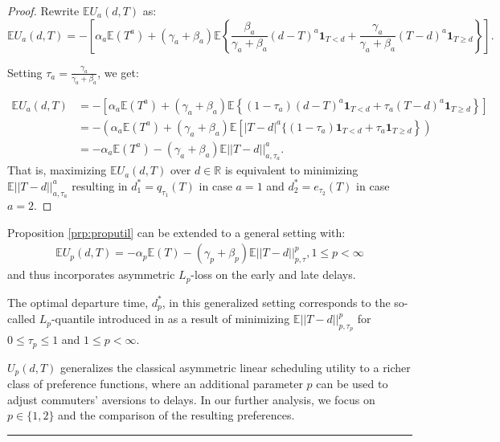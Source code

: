 \documentclass[preprint, 3p, authoryear]{elsarticle} %
\theoremstyle{definition}
\theoremstyle{definition}
\theoremstyle{definition}
\theoremstyle{definition}
\theoremstyle{remark}
\begin{document}
\begin{proof}
Rewrite \(\mathbb EU_a(d,T)\) as:
\[\mathbb EU_a(d,T) = -\left[\alpha_a \mathbb E(T^a) + (\gamma_a+\beta_a)\mathbb E\left\{\frac{\beta_a}{\gamma_a+\beta_a}(d-T)^a\mathbf 1_{T<d}+ \frac{\gamma_a}{\gamma_a+\beta_a}(T-d)^a\mathbf 1_{T\geq d}\right\}\right].\]

Setting \(\tau_a=\frac{\gamma_a}{\gamma_a+\beta_a}\), we get:

\begin{align}
\mathbb EU_a(d,T) &= -\left[\alpha_a \mathbb E(T^a) + (\gamma_a+\beta_a)\mathbb E\left\{(1-\tau_a)(d-T)^a\mathbf 1_{T<d}+ \tau_a(T-d)^a\mathbf 1_{T\geq d}\right\}\right]\nonumber\\
&= -\left(\alpha_a \mathbb E(T^a) + (\gamma_a+\beta_a)\mathbb E\left[|T-d|^a\{(1-\tau_a)\mathbf 1_{T<d}+ \tau_a\mathbf 1_{T\geq d}\right\}\right)\nonumber\\
&= -\alpha_a \mathbb E(T^a) - (\gamma_a+\beta_a)\mathbb E||T-d||_{a,\tau_a}^a. \label{eq:as}
\end{align}
That is, maximizing \(\mathbb EU_a(d,T)\) over \(d\in\mathbb R\) is equivalent to minimizing \(\mathbb E||T-d||_{a,\tau_a}^a\) resulting in \(d_1^*=q_{\tau_1}(T)\) in case \(a=1\) and \(d_2^*=e_{\tau_2}(T)\) in case \(a=2\).
\end{proof}

Proposition \ref{prp:proputil} can be extended to a general setting with:
\begin{align}
\mathbb E U_p(d,T) = -\alpha_p \mathbb E(T) - (\gamma_p+\beta_p)\mathbb E||T-d||_{p,\tau}^p, 1\leq p <\infty\label{eq:up}
\end{align}
and thus incorporates asymmetric \(L_p\)-loss on the early and late delays.

The optimal departure time, \(d_p^*\), in this generalized setting corresponds to the so-called \(L_p\)-quantile introduced in \citet{chen96} as a result of minimizing \(\mathbb E||T-d||_{p,\tau_p}^p\) for \(0\leq\tau_p\leq 1\) and \(1\leq p <\infty\).

\(U_p(d,T)\) generalizes the classical asymmetric linear scheduling utility to a richer class of preference functions, where an additional parameter \(p\) can be used to adjust commuters' aversions to delays. In our further analysis, we focus on \(p\in \{1,2\}\) and the comparison of the resulting preferences.

\begin{center}\rule{0.5\linewidth}{0.5pt}\end{center}
\end{document}
